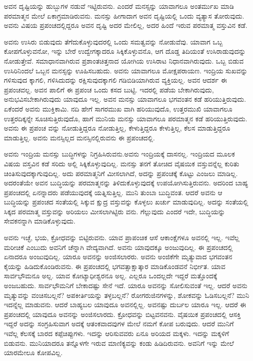 ಅವನ ದೃಷ್ಟಿಯನ್ನು ಹುಬ್ಬುಗಳ ನಡುವೆ ಇಟ್ಟಿರುವನು. ಎಂದರೆ ಮನಸ್ಸನ್ನು ಯಾವಾಗಲೂ ಅಂತರ್ಮುಖ ಮಾಡಿ ಪರಮಾತ್ಮನ ಮೇಲೆ ಏಕಾಗ್ರಮಾಡಿರುವನು. ಮನಸ್ಸು ಹೀಗಾದಾಗ ಅವನ ದೃಷ್ಟಿಯಲ್ಲಿ ಒಂದು ವ್ಯತ್ಯಾಸ ತೋರುವುದು. ಅವನು ವಿಷಯ ಪ್ರಪಂಚದಲ್ಲಿದ್ದರೂ ಅವನ ದೃಷ್ಟಿ ಅದರ ಮೇಲಿಲ್ಲ, ಅದರ ಹಿಂದೆ ಇರುವ ಪರಮಾತ್ಮ ವಸ್ತುವಿನ ಕಡೆ.

ಅವನು ಉಸಿರು ಬಿಡುವುದು ತೆಗೆದುಕೊಳ್ಳುವುದರಲ್ಲಿ ಒಂದು ಸಮತ್ವವನ್ನು ನೋಡುವೆವು. ಯಾವಾಗ ಒಬ್ಬ ಕೋಪಗೊಳ್ಳುವನೋ, ಇನ್ನು ಬೇರೆ ಉದ್ವೇಗಕ್ಕಾದರೂ ಸಿಕ್ಕಿಕೊಳ್ಳುವನೊ, ಆಗ ದೊಡ್ಡ ತಿದಿಯಂತೆ ಉಸಿರಾಡುವುದನ್ನು ನೋಡುತ್ತೇವೆ. ಸಮಾಧಾನವಾಗಿರುವ ಪ್ರಶಾಂತಚಿತ್ತನಾದ ಯೋಗಿಯ ಉಸಿರಾಟ ನಿಧಾನವಾಗಿರುವುದು. ಒಬ್ಬ ಬಿಡುವ ಉಸಿರಿನಿಂದಲೆ ಒಬ್ಬನ ಮನಸ್ಸನ್ನು ಊಹಿಸಬಹುದು. ಅವನು ಯಾವಾಗಲೂ ಮೋಕ್ಷಪರಾಯಣ. ಇಂದ್ರಿಯ ಸುಖವನ್ನು ಗಳಿಸುವುದ ಕ್ಕಾಗಲಿ, ಗಳಿಸಿದುದನ್ನು ರಕ್ಷಿಸುವುದಕ್ಕಾಗಲಿ ಗಡಿಬಿಡಿಯಾಗಿರುವ ವ್ಯಕ್ತಿಯಲ್ಲ. ಅವನ ಆದರ್ಶ ಈ ಪ್ರಪಂಚವಲ್ಲ. ಅವನ ಪಾಲಿಗೆ ಈ ಪ್ರಪಂಚ ಒಂದು ಕಸದ ಬುಟ್ಟಿ. ಇದರಲ್ಲಿ ಪಡೆಯ ಬೇಕಾಗಿರುವುದು, ಅನುಭವಿಸಬೇಕಾಗಿರುವುದು ಯಾವುದೂ ಇಲ್ಲ. ಅವನ ಮನಸ್ಸು ಯಾವಾಗಲೂ ಭಗವಂತನ ಕಡೆ ಹರಿಯುತ್ತಿರುವುದು. ಏಕೆಂದರೆ ಅವನು ಮುಕ್ತಿಕಾಮಿ. ನದಿ ಹೇಗೆ ಸಾಗರಮುಖ ವಾಗಿ ಹರಿಯುವುದೊ, ಉತ್ತರಮುಖಿ ಯಾವಾಗಲೂ ಉತ್ತರದಿಕ್ಕನ್ನೇ ಸೂಚಿಸುತ್ತಿರುವುದೊ, ಹಾಗೆ ಮುನಿಯ ಮನಸ್ಸು ಯಾವಾಗಲೂ ಪರಮಾತ್ಮನ ಕಡೆ ಹರಿಯುತ್ತಿರುವುದು. ಅವನು ಈ ಪ್ರಪಂಚ ವನ್ನು ನೋಡುತ್ತಿದ್ದರೂ ನೋಡುತ್ತಿಲ್ಲ, ಕೇಳುತ್ತಿದ್ದರೂ ಕೇಳುತ್ತಿಲ್ಲ, ಕೆಲಸ ಮಾಡುತ್ತಿದ್ದರೂ ಮಾಡುತ್ತಿಲ್ಲ. ಅವನು ಮನಸ್ಸಿಲ್ಲದ ಮನಸ್ಸಿನಲ್ಲಿರುವನು ಈ ಪ್ರಪಂಚದಲ್ಲಿ.

ಅವನು ಇಂದ್ರಿಯ ಮನಸ್ಸು ಬುದ್ಧಿಗಳನ್ನು ನಿಗ್ರಹಿಸಿರುವನು.ಅವನು ಇಂದ್ರಿಯಕ್ಕೆ ದಾಸನಲ್ಲ. ಇಂದ್ರಿಯದ ಮೂಲಕ ವಿಷಯ ವಸ್ತವಿನ ಕಡೆ ಸರಿದು ಅಲ್ಲಿ ಸಿಕ್ಕಿಕೊಳ್ಳುವುದಿಲ್ಲ. ಮನಸ್ಸು ತನಗೆ ತೋಚಿದ ವೈಷಯಿಕ ವಸ್ತುವನ್ನೆಲ್ಲ ಕುರಿತು ಚಿಂತಿಸುವುದಕ್ಕಾಗುವುದಿಲ್ಲ. ಅದು ಪರಮಾತ್ಮನಿಗೆ ಮೀಸಲಾಗಿದೆ, ಅದನ್ನು ಪ್ರಪಂಚಕ್ಕೆ ಕೊಟ್ಟು ಎಂಜಲು ಮಾಡಿಲ್ಲ. ಅದರಂತೆಯೇ ಅವನ ಬುದ್ಧಿಯನ್ನು ಪರಮಾತ್ಮನನ್ನು ತಿಳಿದುಕೊಳ್ಳುವುದಕ್ಕೆ ಉಪಯೋಗಿಸುತ್ತಿರುವನು. ಅದರಿಂದ ಬಾಹ್ಯ ಪ್ರಪಂಚದಲ್ಲಿ ಏನನ್ನಾದರು ಪಡೆಯುವುದಕ್ಕೆ ಯತ್ನಿಸುತ್ತಿಲ್ಲ. ಮುನಿ ತುಂಬಾ ಬುದ್ಧಿವಂತ. ಆದರೆ ಅವನು ಆ ಬುದ್ಧಿಯನ್ನು ಪ್ರಪಂಚದ ಸಂತೆಯಲ್ಲಿ ಸಿಕ್ಕುವ ಕ್ಷುದ್ರ ವಸ್ತುವನ್ನು ಕೊಳ್ಳಲು ಖರ್ಚು ಮಾಡುವುದಿಲ್ಲ. ಅದನ್ನು ಸಂತೆಯಲ್ಲಿ ಸಿಕ್ಕದ ಪರಮಾತ್ಮ ವಸ್ತುವನ್ನು ಅರಿಯಲು ಮೀಸಲಾಗಿಟ್ಟಿರು ವನು. ಗೆಲ್ಲುವುದು ಎಂದರೆ ಇದೇ, ಬುದ್ಧಿಯನ್ನು ಸೇವಕನನ್ನಾಗಿ ಮಾಡಿಕೊಳ್ಳುವುದು.

ಅವನು ಇಚ್ಛೆ, ಭಯ, ಕ್ರೋಧವನ್ನು ಬಿಟ್ಟಿರುವನು. ಯಾವ ಪ್ರಾಪಂಚಿಕ ಆಸೆ ಆಕಾಂಕ್ಷೆಗಳೂ ಅವನಲ್ಲಿ ಇಲ್ಲ. ಇವೆಲ್ಲ ಮರೀಚಿಕೆ ಎಂಬುದು ಅವನಿಗೆ ಚೆನ್ನಾಗಿ ವೇದ್ಯವಾಗಿದೆ. ಅವನು ಯಾವುದಕ್ಕೂ ಅಂಜುವುದಿಲ್ಲ. ಈ ಪ್ರಪಂಚದಲ್ಲಿ ಏನಾದರೂ ಅಂಜುವುದಿಲ್ಲ. ಯಾರೂ ಅವನನ್ನು ಅಂಜಿಸಲಾರರು. ಅವನು ಅಂಜಿಕೆಗೇ ಮೃತ್ಯುವಾದ ಭಗವಂತನ ಕೈಯನ್ನು ಹಿಡಿದುಕೊಂಡಿರುವನು. ಈ ಪ್ರಪಂಚದಲ್ಲಿ ಭಗವತ್ಸಾಕ್ಷಾತ್ಕಾರ ಮಾಡಿಕೊಂಡವನೆ ನಿರ್ಭೀತ. ಯಾವ ಸಾರ್ವಭೌಮನೂ ಅಲ್ಲ. ಯಾವ ಕೋಟ್ಯಾಧೀಶ್ವರನೂ ಅಲ್ಲ. ಎಲ್ಲರೂ ಒಂದಲ್ಲದೇ ಇದ್ದರೆ ಮತ್ತೊಂದಕ್ಕೆ ಅಂಜಬಹುದು. ಸಾರ್ವಭೌಮನಿಗೆ ಬೇಕಾದಷ್ಟು ಸೇನೆ ಇದೆ. ಯಾರೂ ಅವನನ್ನು ಸೋಲಿಸುವಂತೆ ಇಲ್ಲ. ಆದರೆ ಅವನು ಮೃತ್ಯುವನ್ನು ವಂಚಿಸಬಲ್ಲನೆ? ಅಪಕೀರ್ತಿಯನ್ನು ತಳ್ಳಬಲ್ಲನೆ? ರೋಗರುಜಿನಗಳನ್ನು, ಶೋಕವನ್ನು ಓಡಿಸಬಲ್ಲನೆ? ಮುನಿ ಇದನ್ನೆಲ್ಲ ಮಾಡುವನು. ಆದರೆ ಬಾಹ್ಯಬಲ ಯಾವುದೂ ಅವನಲ್ಲಿಲ್ಲ. ಅವನಷ್ಟು ದುರ್ಬಲ ಯಾರೂ ಇಲ್ಲ. ಆದರೆ ಈ ಪ್ರಪಂಚದಲ್ಲಿ ಯಾವುದೂ ಅವನನ್ನು ಅಂಜಿಸಲಾರದು. ಕ್ರೋಧವನ್ನು ಬಿಟ್ಟವನವನು. ವೈಷಯಿಕ ಪ್ರಪಂಚದಲ್ಲಿ ಆಸಕ್ತಿ ಇದ್ದರೆ ಅದನ್ನು ಸಂಗ್ರಹಿಸುವಾಗ ಅದಕ್ಕೆ ಆತಂಕವಾದವುಗಳ ಮೇಲೆ ನಮಗೆ ಕೋಪ ಬರುವುದು. ಆದರೆ ಮುನಿಗೆ ಇವೆಲ್ಲ ಕೆಲಸಕ್ಕೆ ಬಾರದ ಕಪ್ಪೆಚಿಪ್ಪುಗಳು. ಇದನ್ನು ಆರಿಸುವವರು ಏನೂ ಅರಿಯದ ಮಕ್ಕಳು. ಇದನ್ನು ಮಕ್ಕಳಿಗೆ ಬಿಡುವನು. ಮುನಿಯಾದರೂ ತನ್ನೊಳಗೇ ಇರುವ ಮಾಣಿಕ್ಯವನ್ನು ಕಂಡು ಹಿಡಿದಿರುವನು. ಅವನಿಗೆ ಇನ್ನು ಮೇಲೆ ಯಾರಮೇಲೂ ಕೋಪವಿಲ್ಲ.

